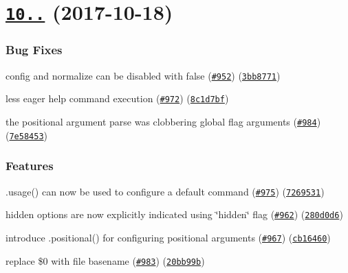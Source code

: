 \label{_10.0.0}%
 \section*{\href{https://github.com/yargs/yargs/compare/v9.1.0...v10.0.0}{\tt 10..} (2017-\/10-\/18)}

\subsubsection*{Bug Fixes}


\begin{DoxyItemize}
\item config and normalize can be disabled with false (\href{https://github.com/yargs/yargs/issues/952}{\tt \#952}) (\href{https://github.com/yargs/yargs/commit/3bb8771}{\tt 3bb8771})
\item less eager help command execution (\href{https://github.com/yargs/yargs/issues/972}{\tt \#972}) (\href{https://github.com/yargs/yargs/commit/8c1d7bf}{\tt 8c1d7bf})
\item the positional argument parse was clobbering global flag arguments (\href{https://github.com/yargs/yargs/issues/984}{\tt \#984}) (\href{https://github.com/yargs/yargs/commit/7e58453}{\tt 7e58453})
\end{DoxyItemize}

\subsubsection*{Features}


\begin{DoxyItemize}
\item .usage() can now be used to configure a default command (\href{https://github.com/yargs/yargs/issues/975}{\tt \#975}) (\href{https://github.com/yargs/yargs/commit/7269531}{\tt 7269531})
\item hidden options are now explicitly indicated using \char`\"{}hidden\char`\"{} flag (\href{https://github.com/yargs/yargs/issues/962}{\tt \#962}) (\href{https://github.com/yargs/yargs/commit/280d0d6}{\tt 280d0d6})
\item introduce .positional() for configuring positional arguments (\href{https://github.com/yargs/yargs/issues/967}{\tt \#967}) (\href{https://github.com/yargs/yargs/commit/cb16460}{\tt cb16460})
\item replace \$0 with file basename (\href{https://github.com/yargs/yargs/issues/983}{\tt \#983}) (\href{https://github.com/yargs/yargs/commit/20bb99b}{\tt 20bb99b})
\end{DoxyItemize}

